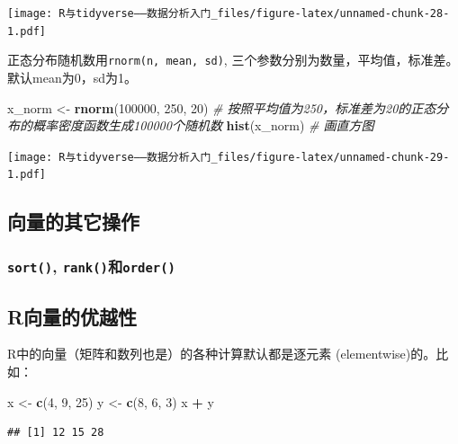 \documentclass[]{book}
\newenvironment{Shaded}{\begin{snugshade}}{\end{snugshade}}
\newcommand{\CommentTok}[1]{\textcolor[rgb]{0.56,0.35,0.01}{\textit{#1}}}
\newcommand{\DecValTok}[1]{\textcolor[rgb]{0.00,0.00,0.81}{#1}}
\newcommand{\KeywordTok}[1]{\textcolor[rgb]{0.13,0.29,0.53}{\textbf{#1}}}
\newcommand{\NormalTok}[1]{#1}
\newcommand{\OperatorTok}[1]{\textcolor[rgb]{0.81,0.36,0.00}{\textbf{#1}}}
\newcommand{\StringTok}[1]{\textcolor[rgb]{0.31,0.60,0.02}{#1}}
\begin{document}
\texttt{[image: R与tidyverse——数据分析入门\_files/figure-latex/unnamed-chunk-28-1.pdf]}

正态分布随机数用\texttt{rnorm(n,\ mean,\ sd)}, 三个参数分别为数量，平均值，标准差。默认mean为0，sd为1。

\begin{Shaded}
\begin{Highlighting}[]
\NormalTok{x_norm <-}\StringTok{ }\KeywordTok{rnorm}\NormalTok{(}\DecValTok{100000}\NormalTok{, }\DecValTok{250}\NormalTok{, }\DecValTok{20}\NormalTok{) }\CommentTok{# 按照平均值为250，标准差为20的正态分布的概率密度函数生成100000个随机数}
\KeywordTok{hist}\NormalTok{(x_norm) }\CommentTok{# 画直方图}
\end{Highlighting}
\end{Shaded}

\texttt{[image: R与tidyverse——数据分析入门\_files/figure-latex/unnamed-chunk-29-1.pdf]}

\subsection{向量的其它操作}

\hypertarget{sort-rankorder}{%
\subsubsection{\texorpdfstring{\texttt{sort()}, \texttt{rank()}和\texttt{order()}}{sort(), rank()和order()}}\label{sort-rankorder}}

\hypertarget{youyuexing}{%
\subsection{R向量的优越性}\label{youyuexing}}

R中的向量（矩阵和数列也是）的各种计算默认都是逐元素 (elementwise)的。比如：

\begin{Shaded}
\begin{Highlighting}[]
\NormalTok{x <-}\StringTok{ }\KeywordTok{c}\NormalTok{(}\DecValTok{4}\NormalTok{, }\DecValTok{9}\NormalTok{, }\DecValTok{25}\NormalTok{)}
\NormalTok{y <-}\StringTok{ }\KeywordTok{c}\NormalTok{(}\DecValTok{8}\NormalTok{, }\DecValTok{6}\NormalTok{, }\DecValTok{3}\NormalTok{)}
\NormalTok{x }\OperatorTok{+}\StringTok{ }\NormalTok{y}
\end{Highlighting}
\end{Shaded}

\begin{verbatim}
## [1] 12 15 28
\end{verbatim}
\end{document}
